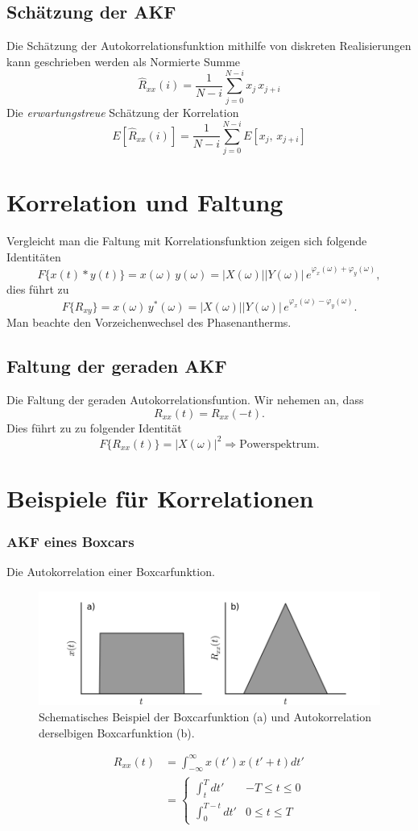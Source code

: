 \subsection{Schätzung der AKF}
Die Schätzung der Autokorrelationsfunktion mithilfe von diskreten Realisierungen kann geschrieben werden als Normierte Summe
\[
\hat R_{xx}(i) = \frac{1}{N-i} \sum_{j=0}^{N-i} x_j\,x_{j+i}
\]
Die \textit{erwartungstreue} Schätzung der Korrelation
\[
E[\hat R_{xx}(i)] = \frac{1}{N-i} \sum_{j=0}^{N-i} E[x_j,\,x_{j+i}]
\]

\section{Korrelation und Faltung}
Vergleicht man die Faltung mit Korrelationsfunktion zeigen sich folgende Identitäten
\[
F\{x(t) \ast y(t)\} = x(\omega)\,y(\omega) = |X(\omega)| |Y(\omega)|\,e^{\varphi_x(\omega) + \varphi_y(\omega)},
\]
dies führt zu
\[
F\{R_{xy}\} = x(\omega)\,y^*(\omega) = |X(\omega)| |Y(\omega)|\,e^{\varphi_x(\omega) - \varphi_y(\omega)}.
\]
Man beachte den Vorzeichenwechsel des Phasenantherms.

\subsection*{Faltung der geraden AKF}
Die Faltung der geraden Autokorrelationsfuntion. Wir nehemen an, dass
\[
R_{xx}(t) = R_{xx}(-t).
\]
Dies führt zu zu folgender Identität
\[
F\{R_{xx}(t)\} = |X(\omega)|^2 \Rightarrow \textrm{Powerspektrum}.
\]

\section{Beispiele für Korrelationen}

\subsubsection*{AKF eines Boxcars}
Die Autokorrelation einer Boxcarfunktion.
\begin{figure}[h!]
\centering
\includegraphics[width=.9\tw]{fig/07-Korrelation/01-example_boxcar.png}
\caption{Schematisches Beispiel der Boxcarfunktion (a) und Autokorrelation derselbigen Boxcarfunktion (b).}
\end{figure}
\begin{align*}
R_{xx}(t) & = \int_{-\infty}^\infty x(t') x(t'+t) dt' \\
& = \begin{cases}
 \int_t^T dt' & -T \leq t \leq 0\\
 \int_0^{T-t} dt' & 0  \leq t \leq T\
 \end{cases}
\end{align*}



